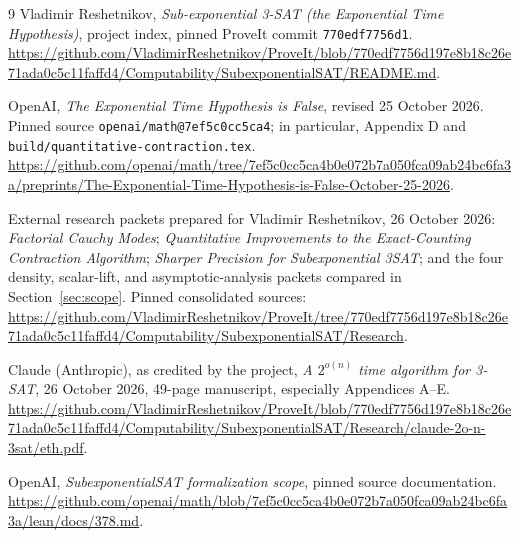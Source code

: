 \documentclass[11pt]{article}
\theoremstyle{remark}\newtheorem{remark}[theorem]{Remark}
\begin{document}
\begin{thebibliography}{9}\small
{}
Vladimir Reshetnikov, \emph{Sub-exponential 3-SAT (the Exponential Time Hypothesis)}, project index, pinned ProveIt commit \texttt{770edf7756d1}.
\url{https://github.com/VladimirReshetnikov/ProveIt/blob/770edf7756d197e8b18c26e71ada0c5c11faffd4/Computability/SubexponentialSAT/README.md}.

OpenAI, \emph{The Exponential Time Hypothesis is False}, revised 25 October 2026. Pinned source \texttt{openai/math@7ef5c0cc5ca4}; in particular, Appendix D and \texttt{build/quantitative-contraction.tex}.
\url{https://github.com/openai/math/tree/7ef5c0cc5ca4b0e072b7a050fca09ab24bc6fa3a/preprints/The-Exponential-Time-Hypothesis-is-False-October-25-2026}.

External research packets prepared for Vladimir Reshetnikov, 26 October 2026: \emph{Factorial Cauchy Modes}; \emph{Quantitative Improvements to the Exact-Counting Contraction Algorithm}; \emph{Sharper Precision for Subexponential 3SAT}; and the four density, scalar-lift, and asymptotic-analysis packets compared in Section~\ref{sec:scope}. Pinned consolidated sources:
\url{https://github.com/VladimirReshetnikov/ProveIt/tree/770edf7756d197e8b18c26e71ada0c5c11faffd4/Computability/SubexponentialSAT/Research}.

Claude (Anthropic), as credited by the project, \emph{A \(2^{o(n)}\) time algorithm for 3-SAT}, 26 October 2026, 49-page manuscript, especially Appendices A--E.
\url{https://github.com/VladimirReshetnikov/ProveIt/blob/770edf7756d197e8b18c26e71ada0c5c11faffd4/Computability/SubexponentialSAT/Research/claude-2o-n-3sat/eth.pdf}.

OpenAI, \emph{SubexponentialSAT formalization scope}, pinned source documentation.
\url{https://github.com/openai/math/blob/7ef5c0cc5ca4b0e072b7a050fca09ab24bc6fa3a/lean/docs/378.md}.
\end{thebibliography}
\end{document}
